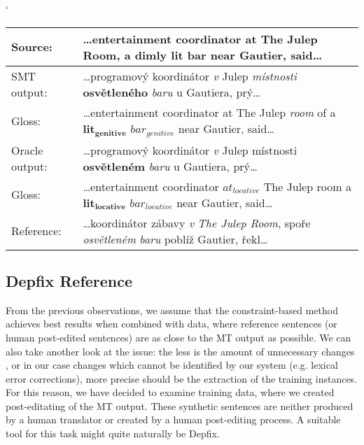 \begin{myexample}
    \small
    \catcode`
    \begin{center}
    \begin{tabular}{|l|p{}|}
    \hline
    \textbf{Source:}  &  \textbf{…entertainment coordinator at The Julep Room, a dimly lit bar near Gautier, said…}  \\
    \hline
    SMT output:  &  …programový koordinátor \textit{v} Julep \textit{místnosti} \textbf{osvětleného} \textit{baru} u Gautiera, prý…  \\
    \hline
    Gloss:  &  …entertainment coordinator at The Julep \textit{room} of a $\mathbf{lit_{genitive}}$ $\mathit{bar_{genitive}}$ near Gautier, said…  \\
    \hline
    Oracle output:  &  …programový koordinátor \textit{v} Julep místnosti \textbf{osvětleném} \textit{baru} u Gautiera, prý…  \\
    \hline
    Gloss:  &  …entertainment coordinator $\mathit{at_{locative}}$ The Julep room a $\mathbf{lit_{locative}}$ $\mathit{bar_{locative}}$ near Gautier, said…  \\
    \hline
    Reference:  &  …koordinátor zábavy \textit{v} \textit{The Julep Room}, spoře \textit{osvětleném} \textit{baru} poblíž Gautier, řekl…  \\
    \hline
    \end{tabular}
    \label{ex-oracle-ambig}
    \end{center}
\end{myexample}

\subsection{Depfix Reference}

From the previous observations, we assume that the constraint-based method achieves
best results when combined with data, where reference sentences
(or human post-edited sentences) are as close to the MT output as possible.
We can also take another look at the issue: the less is the amount of unnecessary changes
, or in our case changes which cannot be identified by our system (e.g. lexical error corrections),
more precise should be the extraction of the training instances.
For this reason, we have decided to examine training data, where we created  post-editating
of the MT output. These synthetic sentences are neither produced by a human translator
or created by a human post-editing process. A suitable tool for this task might quite naturally be Depfix.

